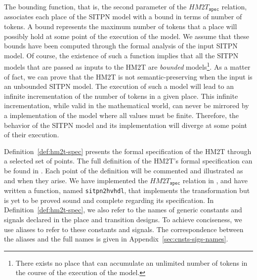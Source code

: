 \documentclass[pdflatex,sn-mathphys]{sn-jnl}%
\theoremstyle{thmstyleone}%
\theoremstyle{thmstyletwo}%
\theoremstyle{thmstylethree}%
\begin{document}
The bounding function, that is, the second parameter of the
$HM2T_{\mathtt{spec}}$ relation, associates each place of the SITPN
model with a bound in terms of number of tokens.  A bound represents
the maximum number of tokens that a place will possibly hold at some
point of the execution of the model. We assume that these bounds have
been computed through the formal analysis of the input SITPN model. Of
course, the existence of such a function implies that all the SITPN
models that are passed as inputs to the HM2T are \textit{bounded}
models\footnote{There exists no place that can accumulate an unlimited
  number of tokens in the course of the execution of the model.}. As a
matter of fact, we can prove that the HM2T is not semantic-preserving
when the input is an unbounded SITPN model. The execution of such a
model will lead to an infinite incrementation of the number of tokens
in a given place. This infinite incrementation, while valid in the
mathematical world, can never be mirrored by a \vhdl{} implementation
of the model where all values must be finite. Therefore, the behavior
of the SITPN model and its \hvhdl{} implementation will diverge at
some point of their execution.

\bigskip

Definition~\ref{def:hm2t-spec} presents the formal specification of
the HM2T through a selected set of points. The full definition of the
HM2T's formal specification can be found in
\cite{Iampietro2022hfspec}. Each point of the definition will be
commented and illustrated as and when they arise. We have implemented
the $HM2T_{\mathtt{spec}}$ relation in \coq{}, and have written a
\coq{} function, named \texttt{sitpn2hvhdl}, that implements the
transformation but is yet to be proved sound and complete regarding
its specification. In Definition~\ref{def:hm2t-spec}, we also refer to
the names of generic constants and signals declared in the place and
transition designs. To achieve conciseness, we use aliases to refer to
these constants and signals. The correspondence between the aliases
and the full names is given in Appendix~\ref{sec:cnsts-sigs-names}.


\def\pdiInBeh{\mathtt{comp}(\gamma(p),\mathtt{place},g_p,i_p,o_p)\in{}d.beh}
\def\tdiInBeh{\mathtt{comp}(\gamma(t),\mathtt{transition},g_t,i_t,o_t)\in{}d.beh}
\def\tdiInBehP#1{\mathtt{comp}(\gamma(#1),\mathtt{transition},g_{#1},i_{#1},o_{#1})\in{}d.beh}
\end{document}

